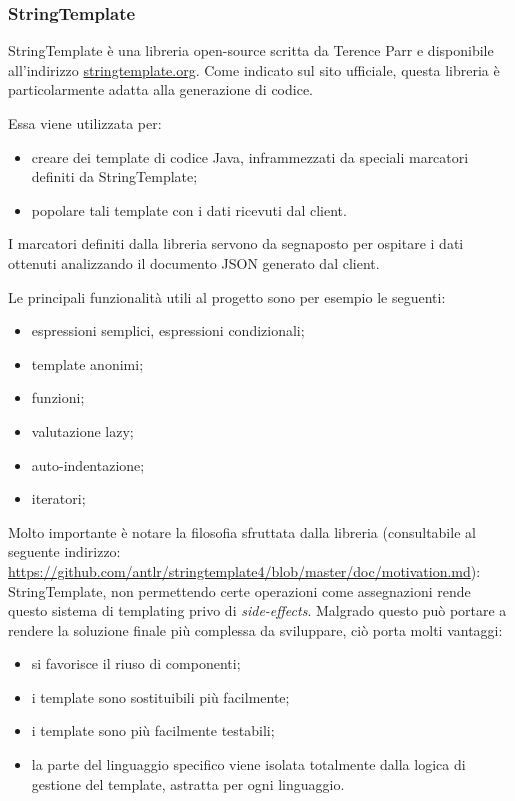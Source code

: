 \subsubsection{StringTemplate}
StringTemplate è una libreria open-source scritta da Terence Parr e disponibile all'indirizzo \url{stringtemplate.org}. Come indicato sul sito ufficiale, questa libreria è particolarmente adatta alla generazione di codice. 

Essa viene utilizzata per:
\begin{itemize}
	\item creare dei template di codice Java, inframmezzati da speciali marcatori definiti da StringTemplate;
	\item popolare tali template con i dati ricevuti dal client.
\end{itemize}
I marcatori definiti dalla libreria servono da segnaposto per ospitare i dati ottenuti analizzando il documento JSON generato dal client.

Le principali funzionalit\`a utili al progetto sono per esempio le seguenti:
\begin{itemize}
	\item espressioni semplici, espressioni condizionali;
	\item template anonimi;
	\item funzioni;
	\item valutazione lazy;
	\item auto-indentazione;
	\item iteratori;
\end{itemize}

Molto importante è notare la filosofia sfruttata dalla libreria (consultabile al seguente indirizzo: \url{https://github.com/antlr/stringtemplate4/blob/master/doc/motivation.md}): StringTemplate, non permettendo certe operazioni come assegnazioni rende questo sistema di templating privo di \emph{side-effects}. Malgrado questo può portare a rendere la soluzione finale più complessa da sviluppare, ciò porta molti vantaggi:
\begin{itemize}
	\item si favorisce il riuso di componenti;
	\item i template sono sostituibili più facilmente;
	\item i template sono più facilmente testabili;
	\item la parte del linguaggio specifico viene isolata totalmente dalla logica di gestione del template, astratta per ogni linguaggio. 
\end{itemize}
